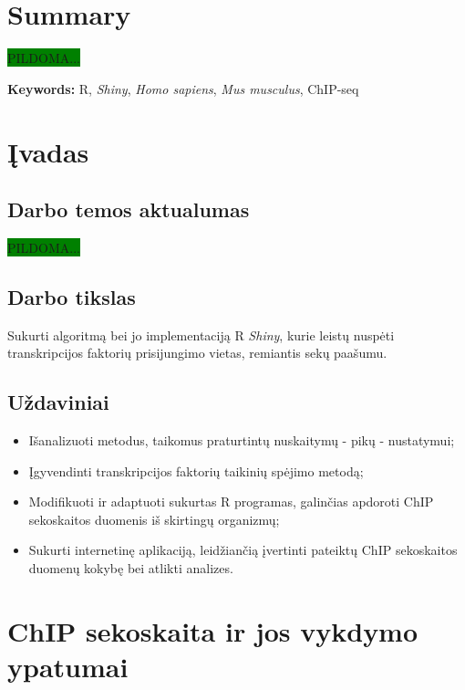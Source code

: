\documentclass[12pt]{article}
\begin{document}
\section*{Summary}
\colorbox{green}{PILDOMA...}

\hfill \break
\textbf{Keywords:} R, \emph{Shiny}, \emph{Homo sapiens},
\emph{Mus musculus}, ChIP-seq

\newpage


\section{Įvadas}
\subsection*{Darbo temos aktualumas}
\colorbox{green}{PILDOMA...}

\subsection*{Darbo tikslas}
Sukurti algoritmą bei jo implementaciją R \emph{Shiny}, kurie leistų nuspėti
transkripcijos faktorių prisijungimo vietas, remiantis sekų paašumu.

\subsection*{Uždaviniai}
\begin{itemize}
    \item Išanalizuoti metodus, taikomus praturtintų nuskaitymų - pikų -
          nustatymui;
    \item Įgyvendinti transkripcijos faktorių taikinių spėjimo metodą;
    \item Modifikuoti ir adaptuoti sukurtas R programas, galinčias apdoroti
          ChIP sekoskaitos duomenis iš skirtingų organizmų;          
    \item Sukurti internetinę aplikaciją, leidžiančią įvertinti pateiktų
          ChIP sekoskaitos duomenų kokybę bei atlikti analizes.

\end{itemize}

\newpage


\section{ChIP sekoskaita ir jos vykdymo ypatumai}
\end{document}
